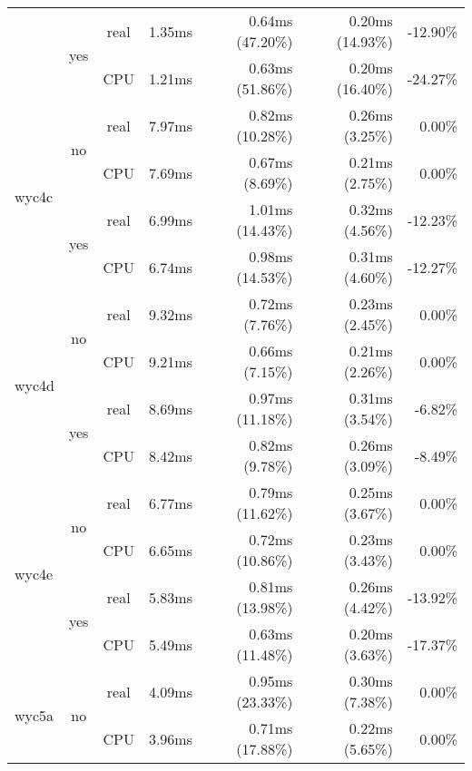 \documentclass[en]{pracamgr}
\begin{document}
\begin{appendices}
\begin{small}
\begin{longtable}{|l|c|c|r|r|r|r|}
                          \cline{2-7}
                          & \multirow{2}{*}{yes} & real & 1.35ms & 0.64ms (47.20\%) & 0.20ms (14.93\%) & -12.90\% \\*
                          &                      & CPU  & 1.21ms & 0.63ms (51.86\%) & 0.20ms (16.40\%) & -24.27\% \\
\hline
\multirow{4}{*}{wyc4c}    & \multirow{2}{*}{no}  & real & 7.97ms & 0.82ms (10.28\%) & 0.26ms (3.25\%) & 0.00\% \\*
                          &                      & CPU  & 7.69ms & 0.67ms (8.69\%) & 0.21ms (2.75\%) & 0.00\% \\*
                          \cline{2-7}
                          & \multirow{2}{*}{yes} & real & 6.99ms & 1.01ms (14.43\%) & 0.32ms (4.56\%) & -12.23\% \\*
                          &                      & CPU  & 6.74ms & 0.98ms (14.53\%) & 0.31ms (4.60\%) & -12.27\% \\
\hline
\multirow{4}{*}{wyc4d}    & \multirow{2}{*}{no}  & real & 9.32ms & 0.72ms (7.76\%) & 0.23ms (2.45\%) & 0.00\% \\*
                          &                      & CPU  & 9.21ms & 0.66ms (7.15\%) & 0.21ms (2.26\%) & 0.00\% \\*
                          \cline{2-7}
                          & \multirow{2}{*}{yes} & real & 8.69ms & 0.97ms (11.18\%) & 0.31ms (3.54\%) & -6.82\% \\*
                          &                      & CPU  & 8.42ms & 0.82ms (9.78\%) & 0.26ms (3.09\%) & -8.49\% \\
\hline
\multirow{4}{*}{wyc4e}    & \multirow{2}{*}{no}  & real & 6.77ms & 0.79ms (11.62\%) & 0.25ms (3.67\%) & 0.00\% \\*
                          &                      & CPU  & 6.65ms & 0.72ms (10.86\%) & 0.23ms (3.43\%) & 0.00\% \\*
                          \cline{2-7}
                          & \multirow{2}{*}{yes} & real & 5.83ms & 0.81ms (13.98\%) & 0.26ms (4.42\%) & -13.92\% \\*
                          &                      & CPU  & 5.49ms & 0.63ms (11.48\%) & 0.20ms (3.63\%) & -17.37\% \\
\hline
\multirow{4}{*}{wyc5a}    & \multirow{2}{*}{no}  & real & 4.09ms & 0.95ms (23.33\%) & 0.30ms (7.38\%) & 0.00\% \\*
                          &                      & CPU  & 3.96ms & 0.71ms (17.88\%) & 0.22ms (5.65\%) & 0.00\% \\*

\end{longtable}
\end{small}
\end{appendices}
\end{document}
